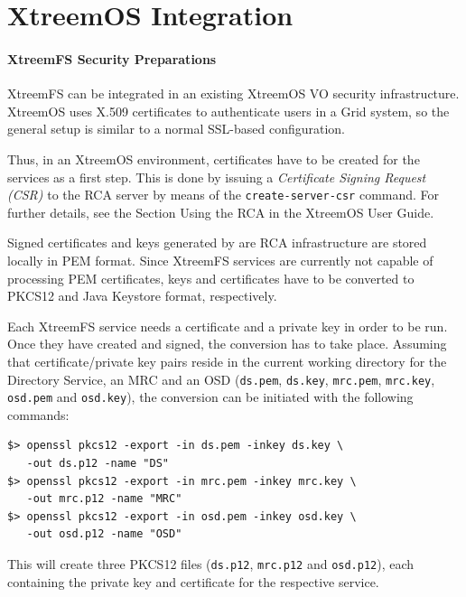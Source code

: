 \documentclass[a4paper,10pt]{book}
\begin{document}
\appendix

\chapter{XtreemOS Integration}

\subsubsection{XtreemFS Security Preparations}
\label{installconf-xfs-security}

XtreemFS can be integrated in an existing XtreemOS VO security infrastructure. XtreemOS uses X.509 certificates to authenticate users in a Grid system, so the general setup is similar to a normal SSL-based configuration.

Thus, in an XtreemOS environment, certificates have to be created for the services as a first step. This is done by issuing a \textit{Certificate Signing Request (CSR)} to the RCA server by means of the \texttt{create-server-csr} command. For further details, see the Section Using the RCA in the XtreemOS User Guide.

Signed certificates and keys generated by are RCA infrastructure are stored locally in PEM format. Since XtreemFS services are currently not capable of processing PEM certificates, keys and certificates have to be converted to PKCS12 and Java Keystore format, respectively.

Each XtreemFS service needs a certificate and a private key in order to be run. Once they have created and signed, the conversion has to take place. Assuming that certificate/private key pairs reside in the current working directory for the Directory Service, an MRC and an OSD (\texttt{ds.pem}, \texttt{ds.key}, \texttt{mrc.pem}, \texttt{mrc.key}, \texttt{osd.pem} and \texttt{osd.key}), the conversion can be initiated with the following commands:


\begin{verbatim}
$> openssl pkcs12 -export -in ds.pem -inkey ds.key \
   -out ds.p12 -name "DS"
$> openssl pkcs12 -export -in mrc.pem -inkey mrc.key \
   -out mrc.p12 -name "MRC"
$> openssl pkcs12 -export -in osd.pem -inkey osd.key \
   -out osd.p12 -name "OSD"
\end{verbatim}

This will create three PKCS12 files (\texttt{ds.p12}, \texttt{mrc.p12} and \texttt{osd.p12}), each containing the private key and certificate for the respective service.
\end{document}
